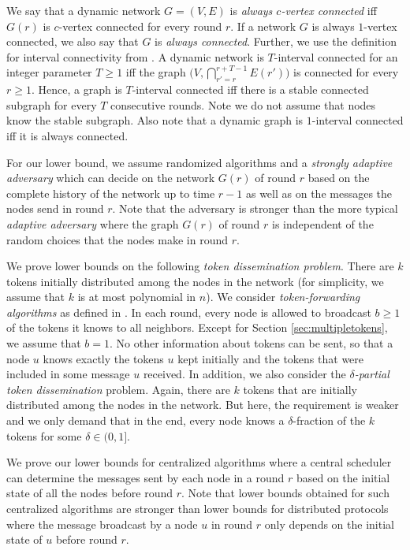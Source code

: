 \documentclass{llncs}
\renewcommand{\paragraph}[1]{\medskip\noindent{\bf #1\ }}
\begin{document}
We say that a dynamic network $G=(V,E)$ is \emph{always $c$-vertex
    connected} iff $G(r)$ is $c$-vertex connected for every round
$r$. If a network $G$ is always $1$-vertex connected, we also say that
$G$ is \emph{always connected}. Further, we use the definition for
interval connectivity from \cite{KLO}. A dynamic network is
$T$-interval connected for an integer parameter $T\geq 1$ iff the
graph $\big(V,\bigcap_{r'=r}^{r+T-1} E(r')\big)$ is connected for
every $r\geq 1$. Hence, a graph is $T$-interval connected iff there is
a stable connected subgraph for every $T$ consecutive rounds. Note we
do not assume that nodes know the stable subgraph. Also note that a
dynamic graph is $1$-interval connected iff it is always connected.

For our lower bound, we assume randomized algorithms and a
\emph{strongly adaptive adversary} which can decide on the network
$G(r)$ of round $r$ based on the complete history of the network up to
time $r-1$ as well as on the messages the nodes send in round
$r$. Note that the adversary is stronger than the more typical
\emph{adaptive adversary} where the graph $G(r)$ of round $r$ is
independent of the random choices that the nodes make in round
$r$.

\paragraph{The Token Dissemination Problem:}
We prove lower bounds on the following \emph{token dissemination
    problem}. There are $k$ tokens initially distributed among the
nodes in the network (for simplicity, we assume that $k$ is at most
polynomial in $n$). We consider \emph{token-forwarding algorithms} as
defined in \cite{KLO}. In each round, every node is allowed to
broadcast $b\geq 1$ of the tokens it knows to all neighbors. Except
for Section \ref{sec:multipletokens}, we assume that $b=1$. No other
information about tokens can be sent, so that a node $u$ knows exactly
the tokens $u$ kept initially and the tokens that were included in
some message $u$ received. In addition, we also consider the
\emph{$\delta$-partial token dissemination} problem. Again, there are
$k$ tokens that are initially distributed among the nodes in the
network. But here, the requirement is weaker and we only demand that
in the end, every node knows a $\delta$-fraction of the $k$ tokens for
some $\delta\in(0,1]$.

We prove our lower bounds for centralized algorithms where a central
scheduler can determine the messages sent by each node in a round $r$
based on the initial state of all the nodes before round $r$. Note
that lower bounds obtained for such centralized algorithms are
stronger than lower bounds for distributed protocols where the message
broadcast by a node $u$ in round $r$ only depends on the initial
state of $u$ before round $r$.
\end{document}
